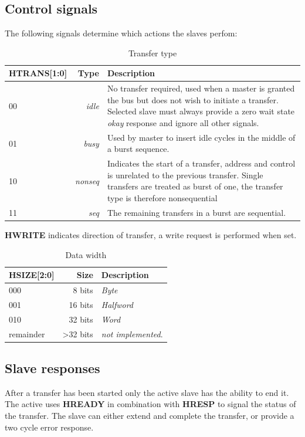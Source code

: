 \newpage
\subsection{Control signals}
The following signals determine which actions the slaves perfom:
\begin{table}[hbt]
  \label{tab:htrans}
  \begin{tabular}{|p{28mm}|r|p{10cm}|} 
  \hline
  \textbf{HTRANS[1:0]} & \textbf{Type} & \textbf{Description} \\
    \hline
  00 & \textit{idle} & No transfer required, used when a master is granted the bus but does not wish to initiate a transfer. Selected slave must always provide a zero wait state \textit{okay} response and ignore all other signals.\\
    \hline
  01 & \textit{busy} & Used by master to insert idle cycles in the middle of a burst sequence. \\
    \hline
  10 & \textit{nonseq} & Indicates the start of a transfer, address and control is unrelated to the previous transfer. Single transfers are treated as burst of one, the transfer type is therefore nonsequential\\
    \hline
  11 & \textit{seq} & The remaining transfers in a burst are sequential.\\
\hline
  \end{tabular}
\caption{Transfer type}
\end{table}

\textbf{HWRITE} indicates direction of transfer, a write request is performed when set.

\begin{table}[hbt]
  \label{tab:hsize}
  \begin{tabular}{|p{25mm}|r|p{10cm}|} 
  \hline
  \textbf{HSIZE[2:0]} & \textbf{Size} & \textbf{Description} \\
    \hline
  000 & 8 bits & \textit{Byte}\\
    \hline
  001 & 16 bits & \textit{Halfword} \\
    \hline
  010 & 32 bits & \textit{Word}\\
    \hline
  remainder & >32 bits & \textit{not implemented}.\\
\hline
  \end{tabular}
\caption{Data width}
\end{table}

\subsection{Slave responses}
\label{subsec:slvresp}
After a transfer has been started only the active slave has the ability to end it. The active uses \textbf{HREADY} in combination with \textbf{HRESP} to signal the status of the transfer. The slave can either extend and complete the transfer, or provide a two cycle error response. 

